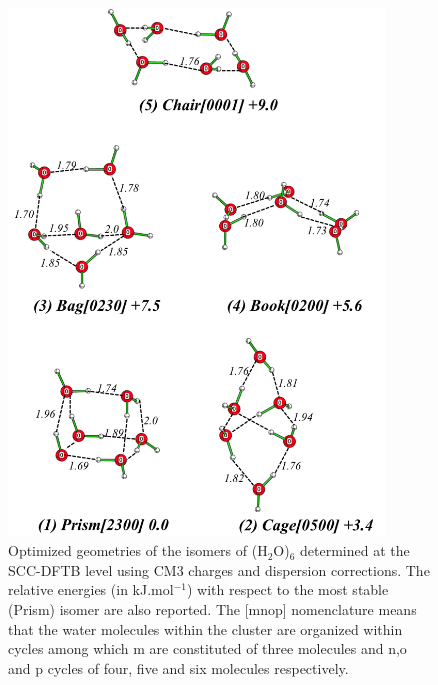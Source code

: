 \documentclass[]{interact}
\theoremstyle{plain}%
\theoremstyle{definition}
\theoremstyle{remark}
\begin{document}
	 \begin{figure}[!ht]
	  \begin{center}
\includegraphics[width=10cm]{geoms_w6.png}
  \end{center}
\caption{Optimized geometries of the isomers of (H$_2$O)$_6$ determined at the SCC-DFTB level using CM3 charges and dispersion corrections. The relative energies (in kJ.mol$^{-1}$) with respect to the most stable (Prism) isomer are also reported. The [mnop] nomenclature means that the water molecules within the cluster are organized within cycles among which m are constituted of three molecules and n,o and p cycles  of four, five and six molecules respectively.  }
\label{fig:geoms_w6}
\end{figure}
\end{document}
